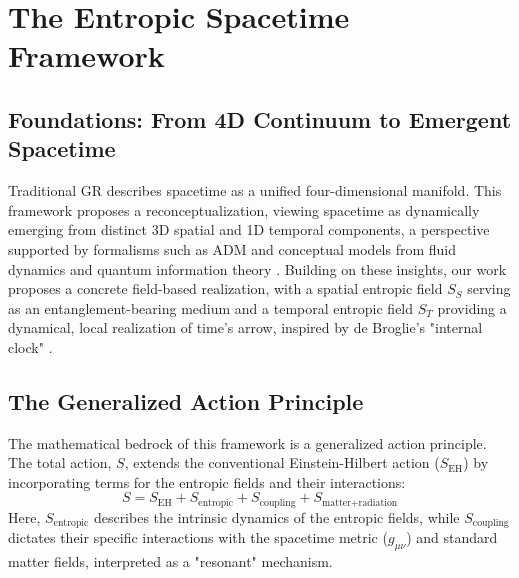 \documentclass[11pt,a4paper]{article}
\newcommand{\SEH}{S_\mathrm{EH}}
\newcommand{\ST}{S_T}
\newcommand{\SSp}{S_S}
\newcommand{\Scoupling}{S_{\text{coupling}}}
\newcommand{\Sentropic}{S_{\text{entropic}}}
\newcommand{\Smatterradiation}{S_{\text{matter+radiation}}}
\begin{document}
\section{The Entropic Spacetime Framework}
\subsection{Foundations: From 4D Continuum to Emergent Spacetime}
Traditional GR describes spacetime as a unified four-dimensional manifold. This framework proposes a reconceptualization, viewing spacetime as dynamically emerging from distinct 3D spatial and 1D temporal components, a perspective supported by formalisms such as ADM \cite{ADM1962} and conceptual models from fluid dynamics \cite{padmanabhan2005gravity} and quantum information theory \cite{vanraamsdonk2010building, swingle2018spacetime}. Building on these insights, our work proposes a concrete field-based realization, with a spatial entropic field $\SSp$ serving as an entanglement-bearing medium and a temporal entropic field $\ST$ providing a dynamical, local realization of time's arrow, inspired by de Broglie's "internal clock" \cite{debroglie1925recherches, altaie2022time}.

\subsection{The Generalized Action Principle}
The mathematical bedrock of this framework is a generalized action principle. The total action, $S$, extends the conventional Einstein-Hilbert action ($\SEH$) \cite{Einstein1916, Hilbert1915} by incorporating terms for the entropic fields and their interactions:
\begin{equation}
    S = \SEH + \Sentropic + \Scoupling + \Smatterradiation
    \label{eq:total_action}
\end{equation}
Here, $\Sentropic$ describes the intrinsic dynamics of the entropic fields, while $\Scoupling$ dictates their specific interactions with the spacetime metric ($g_{\mu\nu}$) and standard matter fields, interpreted as a "resonant" mechanism.
\end{document}
